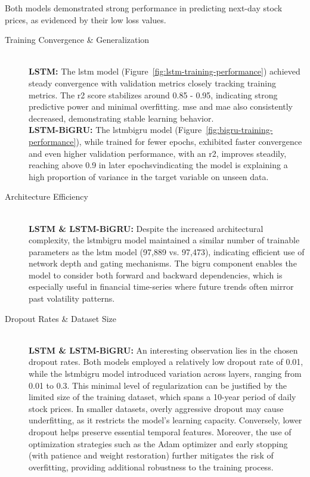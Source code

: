Both models demonstrated strong performance in predicting next-day stock prices, as evidenced by their low loss values.

\begin{description}
    \item[Training Convergence \& Generalization] 
        \leavevmode\\[1em]
        \textbf{LSTM:} The \acrshort{lstm} model (Figure~\ref{fig:lstm-training-performance}) achieved
            steady convergence with 
            validation metrics closely tracking training metrics. The \acrshort{r2} score stabilizes around 0.85 - 0.95, 
            indicating strong predictive power and minimal overfitting. \acrshort{mse} and \acrshort{mae} also 
            consistently decreased, demonstrating stable learning behavior.
        \leavevmode\\[1em]
        \textbf{LSTM-BiGRU:} The \acrshort{lstmbigru} model (Figure~\ref{fig:bigru-training-performance}), while 
        trained for fewer epochs, exhibited 
        faster convergence and even higher validation performance, with 
        an \acrshort{r2}, improves steadily, reaching above 0.9 in 
        later epochsvindicating the 
        model is explaining a high proportion of variance in the target 
        variable on unseen data.
    \item[Architecture Efficiency] 
        \leavevmode\\[1em]
        \textbf{LSTM \& LSTM-BiGRU:} Despite the increased architectural complexity, the \acrshort{lstmbigru} model
        maintained a similar number of trainable parameters as the \acrshort{lstm} model (97,889 vs. 97,473), 
        indicating efficient use of network depth and gating mechanisms. The \acrshort{bigru} component enables the 
        model to consider both forward and backward dependencies, which is especially useful in 
        financial time-series where future trends often mirror past volatility patterns.
    \item[Dropout Rates \& Dataset Size] 
        \leavevmode\\[1em]
        \textbf{LSTM \& LSTM-BiGRU:} 
        An interesting observation lies in the chosen dropout rates. Both models 
        employed a relatively low dropout rate of 0.01, while the \acrshort{lstmbigru} model introduced variation 
        across layers, ranging from 0.01 to 0.3. This minimal level of regularization can be justified by the limited 
        size of the training dataset, which spans a 10-year period of daily stock prices. In smaller datasets, 
        overly aggressive dropout may cause underfitting, as it restricts the model's learning capacity. Conversely, 
        lower dropout helps preserve essential temporal features. Moreover, the use of optimization strategies such 
        as the Adam optimizer and early stopping (with patience and weight restoration) further mitigates the 
        risk of overfitting, providing additional robustness to the training process. 
\end{description}


